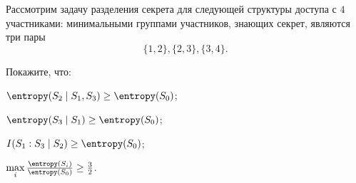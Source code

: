 Рассмотрим задачу разделения секрета для следующей структуры доступа с $4$ участниками: минимальными
группами участников, знающих секрет, являются три пары
$$
    \{1, 2\}, \{2, 3\}, \{3, 4\}.
$$

Покажите, что:
\begin{enumcyr}
    \item $\entropy(S_2 \mid S_1, S_3) \ge \entropy(S_0)$;
    \item $\entropy(S_3 \mid S_1) \ge \entropy(S_0)$;
    \item $I(S_1 : S_3 \mid S_2) \ge \entropy(S_0)$;
    \item $\max\limits_i \frac{\entropy(S_i)}{\entropy(S_0)} \ge \frac{3}{2}$.
\end{enumcyr}
    